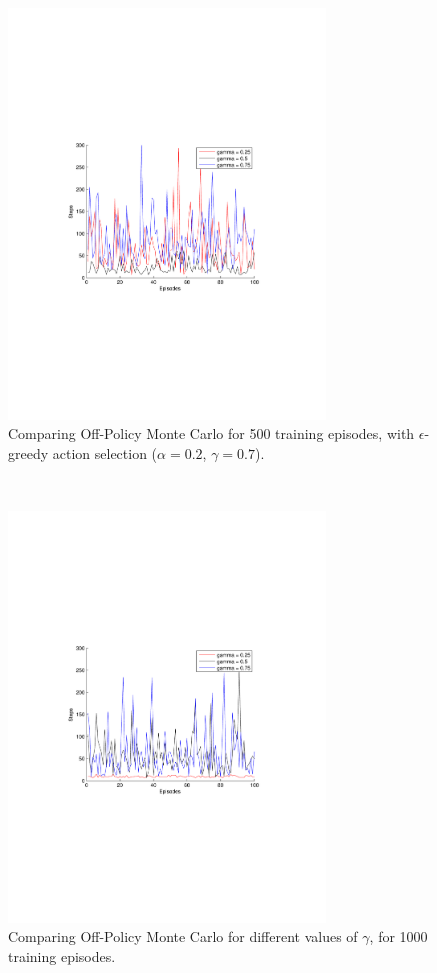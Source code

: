 \documentclass[a4paper,11pt]{article}
\begin{document}
\begin{figure}[h!]
  \centering
    \includegraphics[trim=4cm 8.5cm 4cm 8.5cm,clip,width=0.75\textwidth]{figures/offmc500.pdf}
    \caption{Comparing Off-Policy Monte Carlo for 500 training episodes, with $\epsilon$-greedy action selection ($\alpha = 0.2$, $\gamma = 0.7$).}
    \label{offmc500}
\end{figure}
~
\begin{figure}[h!]
  \centering
    \includegraphics[trim=4cm 8.5cm 4cm 8.5cm,clip,width=0.75\textwidth]{figures/offmc1000.pdf}
    \caption{Comparing Off-Policy Monte Carlo for different values of $\gamma$, for 1000 training episodes.}
    \label{offmc1000}
\end{figure}
\end{document}
